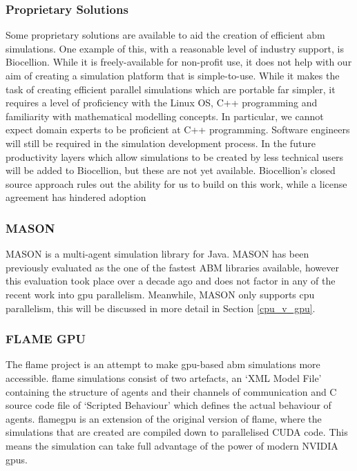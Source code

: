 \documentclass{UoYCSproject}
\begin{document}
\subsubsection{Proprietary Solutions}
Some proprietary solutions are available to aid the creation of efficient \gls{abm} simulations.
One example of this, with a reasonable level of industry support, is Biocellion\cite{biocellion_paper}.
While it is freely-available for non-profit use, it does not help with our aim of creating a simulation platform that is simple-to-use.
While it makes the task of creating efficient parallel simulations which are portable far simpler, it requires a level of proficiency with the Linux OS, C++ programming and familiarity with mathematical modelling concepts.
In particular, we cannot expect domain experts to be proficient at C++ programming.
Software engineers will still be required in the simulation development process.
In the future productivity layers which allow simulations to be created by less technical users will be added to Biocellion, but these are not yet available.\cite{biocellion_paper}
Biocellion's closed source approach rules out the ability for us to build on this work, while a license agreement has hindered adoption\cite{physicell}


\subsubsection{\gls{MASON}}
\gls{MASON} is a multi-agent simulation library for Java.
\gls{MASON} has been previously evaluated as the one of the fastest ABM libraries available\cite{abm_platforms_review}, however this evaluation took place over a decade ago and does not factor in any of the recent work into \acrshort{gpu} parallelism\cite{flame_simulation, biocellion_paper, physicell}.
Meanwhile, \gls{MASON} only supports \gls{cpu} parallelism, this will be discussed in more detail in Section \ref{cpu_v_gpu}.



\subsubsection{\gls{FLAME GPU}}
The \gls{flame} project is an attempt to make \gls{gpu}-based \gls{abm} simulations more accessible.
\gls{flame} simulations consist of two artefacts, an `XML Model File' containing the structure of agents and their channels of communication and C source code file of `Scripted Behaviour' which defines the actual behaviour of agents.
\acrfull{flamegpu} is an extension of the original version of \acrshort{flame}, where the simulations that are created are compiled down to parallelised CUDA code.
This means the simulation can take full advantage of the power of modern NVIDIA \acrshort{gpu}s.
\end{document}
